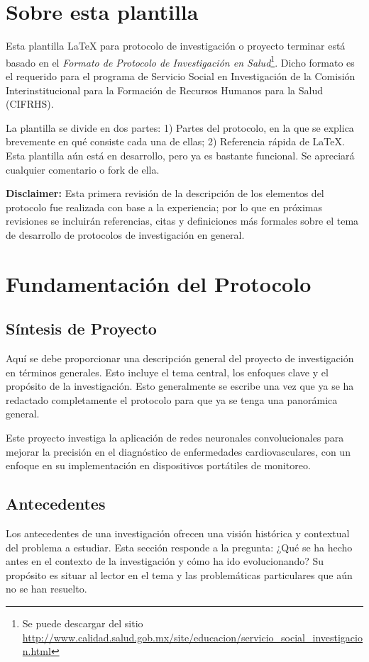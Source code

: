 \documentclass[12pt,letterpaper,spanish, twoside]{article}
\title{}
\author{Omar Piña Ramírez}
\begin{document}
 


\section*{Sobre esta plantilla}
Esta plantilla \LaTeX{} para protocolo de investigación o proyecto terminar está basado en el \textit{Formato de Protocolo de Investigación en Salud}\footnote{Se puede descargar del sitio \url{http://www.calidad.salud.gob.mx/site/educacion/servicio_social_investigacion.html}}. Dicho formato es el requerido para el programa de Servicio Social en Investigación de la Comisión Interinstitucional para la Formación de Recursos Humanos para la Salud (CIFRHS).

La plantilla se divide en dos partes: 1) Partes del protocolo, en la que se explica brevemente en qué consiste cada una de ellas; 2) Referencia rápida de \LaTeX. Esta plantilla aún está en desarrollo, pero ya es bastante funcional. Se apreciará cualquier comentario o fork de ella.

\textbf{Disclaimer:} Esta primera revisión de la descripción de los elementos del protocolo fue realizada con base a la experiencia; por lo que en próximas revisiones se incluirán referencias, citas y definiciones más formales sobre el tema de desarrollo de protocolos de investigación en general.

\section{Fundamentación del Protocolo}
\subsection{Síntesis de Proyecto}
Aquí se debe proporcionar una descripción general del proyecto de investigación en términos generales. Esto incluye el tema central, los enfoques clave y el propósito de la investigación. Esto generalmente se escribe una vez que ya se ha redactado completamente el protocolo para que ya se tenga una panorámica general.

\ej Este proyecto investiga la aplicación de redes neuronales convolucionales para mejorar la precisión en el diagnóstico de enfermedades cardiovasculares, con un enfoque en su implementación en dispositivos portátiles de monitoreo.

\subsection{Antecedentes}
Los antecedentes de una investigación ofrecen una visión histórica y contextual del problema a estudiar. Esta sección responde a la pregunta: ¿Qué se ha hecho antes en el contexto de la investigación y cómo ha ido evolucionando? Su propósito es situar al lector en el tema y las problemáticas particulares que aún no se han resuelto.
\end{document}
